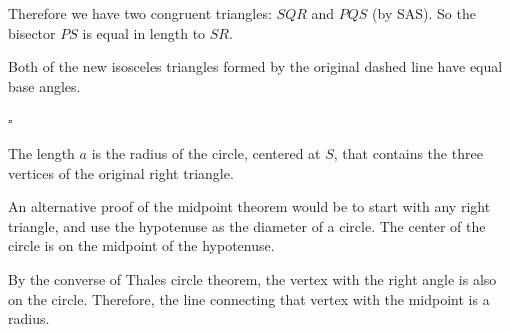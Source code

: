 \documentclass[11pt, oneside]{article}
\begin{document}
Therefore we have two congruent triangles:  $SQR$ and $PQS$ (by SAS).  So the bisector $PS$ is equal in length to $SR$.

Both of the new isosceles triangles formed by the original dashed line have equal base angles.

$\square$

The length $a$ is the radius of the circle, centered at $S$, that contains the three vertices of the original right triangle.

An alternative proof of the midpoint theorem would be to start with any right triangle, and use the hypotenuse as the diameter of a circle.  The center of the circle is on the midpoint of the hypotenuse.

By the converse of Thales circle theorem, the vertex with the right angle is also on the circle.  Therefore, the line connecting that vertex with the midpoint is a radius.
\end{document}

